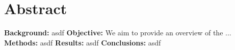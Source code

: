 \section{Abstract}
\textbf{Background:} asdf
\textbf{Objective:} We aim to provide an overview of the ...
\textbf{Methods:} asdf
\textbf{Results:} asdf
\textbf{Conclusions:} asdf